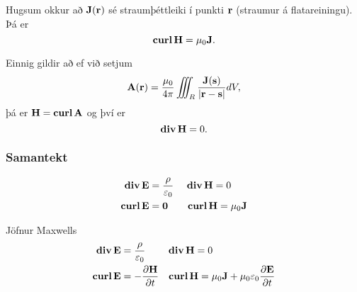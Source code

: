  Hugsum okkur að $\mathbf{J}(\rv)$ sé straumþéttleiki í punkti $\rv$ (straumur á flatareiningu).  Þá er 
$$\curl \Hv = \mu_0 \mathbf{J}.$$

Einnig gildir að ef við setjum 
$$\Av(\rv)=\frac{\mu_0}{4\pi}\iiint_{R}
\frac{\mathbf{J}(\mathbf{s})}{|\rv-\sv|}dV,$$
þá er $\Hv=\curl \Av$  og því er $$\dive \Hv=0.$$


\subsubsection{Samantekt}
 \begin {align*}
  \dive \Ev &= \frac{\rho}{\epsilon_0} \quad~ \dive \Hv = 0 \\
  \curl \Ev &= \mathbf{0} \qquad \curl \Hv = \mu_0 \mathbf{J}
 \end {align*}

 Jöfnur Maxwells
 \begin {align*}
  \dive \Ev &= \frac{\rho}{\epsilon_0} \qquad ~ \dive \Hv = 0 \\
  \curl \Ev &= -\frac{\partial \Hv}{\partial t} \quad \curl \Hv = \mu_0 \mathbf{J} + \mu_0 \epsilon_0  \frac{\partial\Ev}{\partial t}
 \end {align*}






